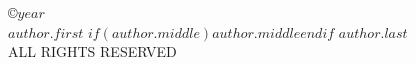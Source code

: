 \documentclass[$if(fontsize)$$fontsize$,$endif$,letterpaper,twoside]{report}
\begin{document}



\begin{center}
\begin{singlespace}
\copyright $year$ \\
$author.first$ $if(author.middle)$$author.middle$$endif$ $author.last$ \\
ALL RIGHTS RESERVED
\end{singlespace}
\end{center}

\clearpage
{}

\restoregeometry

\end{document}
